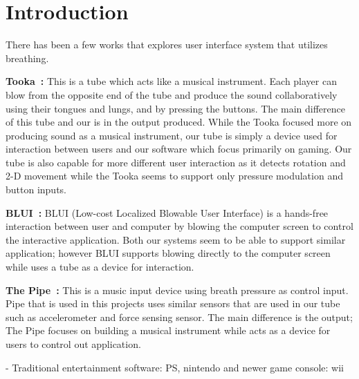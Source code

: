 \section{Introduction}\label{sec:intro}

There has been a few works that explores user interface system that utilizes breathing.

\textbf{Tooka~\cite{tooka}:} This is a tube which acts like a musical instrument. Each player can blow from the opposite end of the tube and produce the sound collaboratively using their tongues and lungs, and by pressing the buttons. The main difference of this tube and our \tube is in the output produced. While the Tooka focused more on producing sound as a musical instrument, our tube is simply a device used for interaction between users and our software which focus primarily on gaming. Our tube is also capable for more different user interaction as it detects rotation and 2-D movement while the Tooka seems to support only pressure modulation and button inputs.

\textbf{BLUI~\cite{blui}:} BLUI (Low-cost Localized Blowable User Interface) is a hands-free interaction between user and computer by blowing the computer screen to control the interactive application. Both our systems seem to be able to support similar application; however BLUI supports blowing directly to the computer screen while \tube uses a tube as a device for interaction.

\textbf{The Pipe~\cite{thepipe}:} This is a music input device using breath pressure as control input. Pipe that is used in this projects uses similar sensors that are used in our tube such as accelerometer and force sensing sensor. The main difference is the output; The Pipe focuses on building a musical instrument while \tube acts as a device for users to control out application.

\TODO
- Traditional entertainment software: PS, nintendo and newer game console: wii
